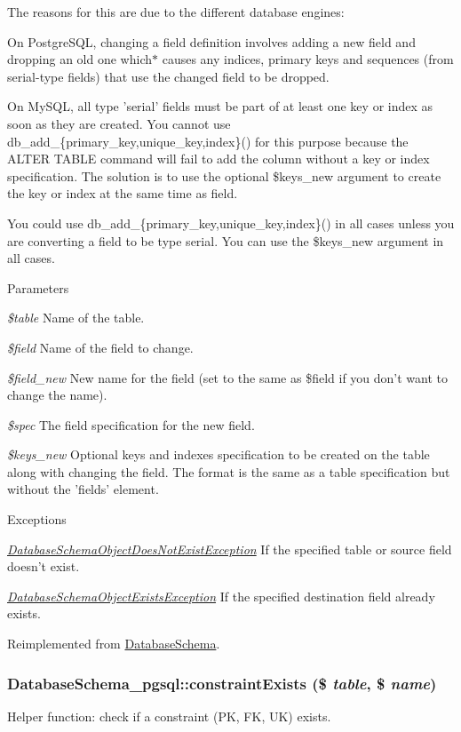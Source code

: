 The reasons for this are due to the different database engines:

On PostgreSQL, changing a field definition involves adding a new field and dropping an old one which$\ast$ causes any indices, primary keys and sequences (from serial-\/type fields) that use the changed field to be dropped.

On MySQL, all type 'serial' fields must be part of at least one key or index as soon as they are created. You cannot use db\_\-add\_\-\{primary\_\-key,unique\_\-key,index\}() for this purpose because the ALTER TABLE command will fail to add the column without a key or index specification. The solution is to use the optional \$keys\_\-new argument to create the key or index at the same time as field.

You could use db\_\-add\_\-\{primary\_\-key,unique\_\-key,index\}() in all cases unless you are converting a field to be type serial. You can use the \$keys\_\-new argument in all cases.


\begin{DoxyParams}{Parameters}
\item[{\em \$table}]Name of the table. \item[{\em \$field}]Name of the field to change. \item[{\em \$field\_\-new}]New name for the field (set to the same as \$field if you don't want to change the name). \item[{\em \$spec}]The field specification for the new field. \item[{\em \$keys\_\-new}]Optional keys and indexes specification to be created on the table along with changing the field. The format is the same as a table specification but without the 'fields' element.\end{DoxyParams}

\begin{DoxyExceptions}{Exceptions}
\item[{\em \hyperlink{classDatabaseSchemaObjectDoesNotExistException}{DatabaseSchemaObjectDoesNotExistException}}]If the specified table or source field doesn't exist. \item[{\em \hyperlink{classDatabaseSchemaObjectExistsException}{DatabaseSchemaObjectExistsException}}]If the specified destination field already exists. \end{DoxyExceptions}


Reimplemented from \hyperlink{classDatabaseSchema_ab2470d34145fdbb413dd952baf7067be}{DatabaseSchema}.\hypertarget{classDatabaseSchema__pgsql_ae795d8b318af21e0e57bb6ba9ea7ad93}{
\subsubsection[{constraintExists}]{\setlength{\rightskip}{0pt plus 5cm}DatabaseSchema\_\-pgsql::constraintExists (\$ {\em table}, \/  \$ {\em name})}}
\label{classDatabaseSchema__pgsql_ae795d8b318af21e0e57bb6ba9ea7ad93}
Helper function: check if a constraint (PK, FK, UK) exists.


